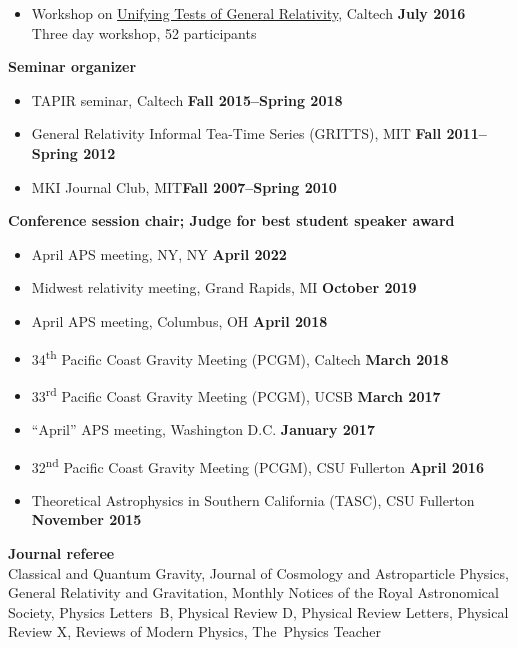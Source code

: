 \documentclass[margin,line]{res}
\begin{document}
\begin{resume}
\begin{itemize}
\hspace*{1em} Two-day conference, $\sim 125$ participants
\item[] Workshop on \href{http://www.tapir.caltech.edu/~unifying-gr-tests/}{Unifying Tests of General Relativity},
  Caltech \hfill {\bf July 2016} \\
\hspace*{1em} Three day workshop, 52 participants
\end{itemize}
{\bf Seminar organizer}
\vspace*{.05in}
\begin{itemize}
\item[] TAPIR seminar, Caltech\hfill
  {\bf Fall 2015--Spring 2018}
\item[] General Relativity Informal Tea-Time Series (GRITTS), MIT\hfill
  {\bf Fall 2011--Spring 2012}
\item[] MKI Journal Club, MIT\hfill {\bf Fall 2007--Spring 2010}
\end{itemize}
{\bf Conference session chair; Judge for best student speaker award}
\vspace*{.05in}
\begin{itemize}
\item[]
April APS meeting, NY, NY
\hfill {\bf April 2022}
\item[]
Midwest relativity meeting, Grand Rapids, MI
\hfill {\bf October 2019}
\item[]
April APS meeting, Columbus, OH
\hfill {\bf April 2018}
\item[]
34\textsuperscript{th} Pacific Coast Gravity Meeting (PCGM),
Caltech
\hfill {\bf March 2018}
\item[]
33\textsuperscript{rd} Pacific Coast Gravity Meeting (PCGM),
UCSB
\hfill {\bf March 2017}
\item[]
``April'' APS meeting, Washington D.C.
\hfill {\bf January 2017}
\item[]
32\textsuperscript{nd} Pacific Coast Gravity Meeting (PCGM),
CSU Fullerton
\hfill {\bf April 2016}
\item[]
Theoretical Astrophysics in Southern California (TASC),
CSU Fullerton
\hfill {\bf November 2015}
\end{itemize}

{\bf Journal referee}
\vspace*{.05in}\\
\hspace*{1em}
Classical and Quantum Gravity,
Journal of Cosmology and Astroparticle Physics,
General Relativity and Gravitation,
Monthly Notices of the Royal Astronomical Society,
Physics Letters~B,
Physical Review D,
Physical Review Letters,
Physical Review X,
Reviews of Modern Physics,
The~Physics Teacher


\end{resume}
\end{document}
